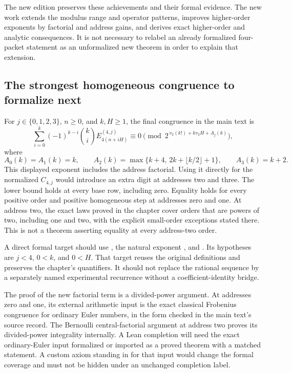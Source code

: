 The new edition preserves these achievements and their formal evidence. The new work extends the modulus range and operator patterns, improves higher-order exponents by factorial and address gains, and derives exact higher-order and analytic consequences. It is not necessary to relabel an already formalized four-packet statement as an unformalized new theorem in order to explain that extension.

\subsection{The strongest homogeneous congruence to formalize next}
For $j\in\{0,1,2,3\}$, $n\ge0$, and $k,H\ge1$, the final congruence in the main text is
\[
 \sum_{i=0}^k(-1)^{k-i}\binom{k}{i}
 E_{4(n+iH)}^{(4,j)}\equiv0
 \pmod{2^{\,v_2(k!)+k v_2H+A_j(k)}},
\]
where
\[
 A_0(k)=A_1(k)=k,\qquad
 A_2(k)=\max\{k+4,\,2k+\lfloor k/2\rfloor+1\},\qquad
 A_3(k)=k+2.
\]
This displayed exponent includes the address factorial. Using it directly for the normalized $C_{4,j}$ would introduce an extra digit at addresses two and three. The lower bound holds at every base row, including zero. Equality holds for every positive order and positive homogeneous step at addresses zero and one. At address two, the exact laws proved in the chapter cover orders that are powers of two, including one and two, with the explicit small-order exceptions stated there. This is not a theorem asserting equality at every address-two order.

A direct formal target should use , the natural exponent , and . Its hypotheses are $j<4$, $0<k$, and $0<H$. That target reuses the original definitions and preserves the chapter's quantifiers. It should not replace the rational sequence by a separately named experimental recurrence without a coefficient-identity bridge.

The proof of the new factorial term is a divided-power argument. At addresses zero and one, its external arithmetic input is the exact classical Frobenius congruence for ordinary Euler numbers, in the form checked in the main text's source record. The Bernoulli central-factorial argument at address two proves its divided-power integrality internally. A Lean completion will need the exact ordinary-Euler input formalized or imported as a proved theorem with a matched statement. A custom axiom standing in for that input would change the formal coverage and must not be hidden under an unchanged completion label.

